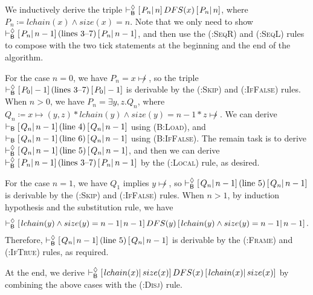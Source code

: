 We inductively derive the triple $\vdash^{\Diamond}_{\mathsf{B}}\left[\left.P_n\right|n\right]DFS(x)\left[\left.P_n\right|n\right]$, where $P_n\coloneqq lchain(x)\land size(x)=n$.
Note that we only need to show $\vdash^{\Diamond}_{\mathsf{B}}\left[\left.P_n\right|n-1\right]\text{(lines 3--7)}\left[\left.P_n\right|n-1\right]$, and then use the \textsc{(\Bd:SeqR)} and \textsc{(\Bd:SeqL)} rules to compose with the two tick statements at the beginning and the end of the algorithm.

For the case $n=0$, we have $P_n=x\not\mapsto$, so the triple $\vdash^{\Diamond}_{\mathsf{B}}\left[\left.P_0\right|-1\right]\text{(lines 3--7)}\left[\left.P_0\right|-1\right]$ is derivable by the \textsc{(\Bd:Skip)} and \textsc{(\Bd:IfFalse)} rules.
When $n>0$, we have $P_n=\exists y,z.Q_n$, where $Q_n\coloneqq x\mapsto(y,z)*lchain(y)\land size(y)=n-1*z\not\mapsto$.
We can derive $\vdash_{\mathsf{B}}\left[\left.Q_n\right|n-1\right]\text{(line 4)}\left[\left.Q_n\right|n-1\right]$ using \textsc{(B:Load)}, and $\vdash_{\mathsf{B}}\left[\left.Q_n\right|n-1\right]\text{(line 6)}\left[\left.Q_n\right|n-1\right]$ using \textsc{(B:IfFalse)}.
The remain task is to derive $\vdash^{\Diamond}_{\mathsf{B}}\left[\left.Q_n\right|n-1\right]\text{(line 5)}\left[\left.Q_n\right|n-1\right]$, and then we can derive $\vdash^{\Diamond}_{\mathsf{B}}\left[\left.P_n\right|n-1\right]\text{(lines 3--7)}\left[\left.P_n\right|n-1\right]$ by the \textsc{(\Bd:Local)} rule, as desired.

For the case $n=1$, we have $Q_1$ implies $y\not\mapsto$, so $\vdash^{\Diamond}_{\mathsf{B}}\left[\left.Q_n\right|n-1\right]\text{(line 5)}\left[\left.Q_n\right|n-1\right]$ is derivable by the \textsc{(\Bd:Skip)} and \textsc{(\Bd:IfFalse)} rules.
When $n>1$, by induction hypothesis and the substitution rule, we have
\begin{align*}
  \vdash^{\Diamond}_{\mathsf{B}}\left[\left.lchain(y)\land size(y)=n-1\right|n-1\right]DFS(y)\left[\left.lchain(y)\land size(y)=n-1\right|n-1\right].
\end{align*}
Therefore, $\vdash^{\Diamond}_{\mathsf{B}}\left[\left.Q_n\right|n-1\right]\text{(line 5)}\left[\left.Q_n\right|n-1\right]$ is derivable by the \textsc{(\Bd:Frame)} and \textsc{(\Bd:IfTrue)} rules, as required.

At the end, we derive $\vdash^{\Diamond}_{\mathsf{B}}\left[\left.lchain(x)\right|size(x)\right]DFS(x)\left[\left.lchain(x)\right|size(x)\right]$ by combining the above cases with the \textsc{(\Bd:Disj)} rule.
